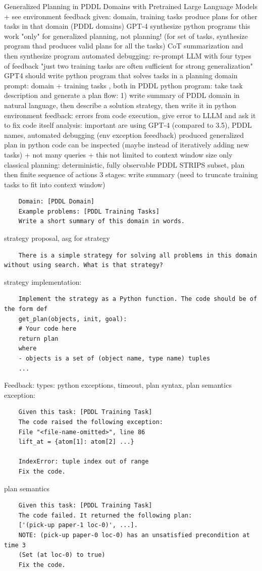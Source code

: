 \documentclass{article}
\begin{document}
\cite{silver_generalized_2023} Generalized Planning in PDDL Domains with Pretrained Large Language Models + see environment feedback
given: domain, training tasks
produce plans for other tasks in that domain (PDDL domains)
GPT-4
synthesize python programs
this work "only" for generalized planning, not planning! (for set of tasks, synthesize program thad produces valid plans for all the tasks)
CoT summarization and then synthesize program
automated debugging: re-prompt LLM with four types of feedback
"just two training tasks are often sufficient for strong generalization"
GPT4 should write python program that solves tasks in a planning domain
prompt: domain + training tasks , both in PDDL
python program: take task description and generate a plan
flow: 1) write summary of PDDL domain in natural language, then describe a solution strategy, then write it in python
environment feedback: errors from code execution, give error to LLLM and ask it to fix code itself
analysis: important are using GPT-4 (compared to 3.5), PDDL names, automated debugging (env exception feeedback)
produced generalized plan in python code can be inspected (maybe instead of iteratively adding new tasks) +  not many queries +  this not limited to context window size
only classical planning: deterministic, fully observable
PDDL STRIPS subset, plan then finite sequence of actions
3 stages:
write summary (need to truncate training tasks to fit into context window)
\begin{verbatim}
	Domain: [PDDL Domain] 
	Example problems: [PDDL Training Tasks] 
	Write a short summary of this domain in words.
\end{verbatim}
strategy proposal, asg for strategy
\begin{verbatim}
	There is a simple strategy for solving all problems in this domain without using search. What is that strategy?
\end{verbatim}
strategy implementation:
\begin{verbatim}
	Implement the strategy as a Python function. The code should be of the form def 
	get_plan(objects, init, goal): 
	# Your code here 
	return plan 
	where
	- objects is a set of (object name, type name) tuples
	...
\end{verbatim}
Feedback: types: python exceptions, timeout, plan syntax, plan semantics
exception:
\begin{verbatim}
	Given this task: [PDDL Training Task] 
	The code raised the following exception: 
	File "<file-name-omitted>", line 86 
	lift_at = {atom[1]: atom[2] ...}
	
	IndexError: tuple index out of range 
	Fix the code.
\end{verbatim}
plan semantics
\begin{verbatim}
	Given this task: [PDDL Training Task] 
	The code failed. It returned the following plan: 
	['(pick-up paper-1 loc-0)', ...]. 
	NOTE: (pick-up paper-0 loc-0) has an unsatisfied precondition at time 3 
	(Set (at loc-0) to true) 
	Fix the code.
\end{verbatim}
\end{document}
